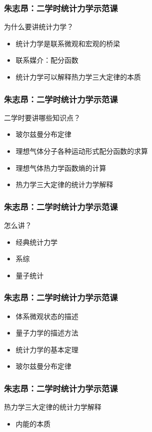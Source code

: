 \documentclass[dvipsnames, svgnames, x11names]{beamer}
\begin{document}
\begin{frame}
    \frametitle{朱志昂：二学时统计力学示范课}
    为什么要讲统计力学？
    \begin{itemize}
      \item 统计力学是联系微观和宏观的桥梁
      \item 联系媒介：配分函数
      \item 统计力学可以解释热力学三大定律的本质
    \end{itemize}
\end{frame}


\begin{frame}
    \frametitle{朱志昂：二学时统计力学示范课}
    二学时要讲哪些知识点？
    \begin{itemize}
      \item 玻尔兹曼分布定律
      \item 理想气体分子各种运动形式配分函数的求算
      \item 理想气体热力学函数熵的计算
      \item 热力学三大定律的统计力学解释
    \end{itemize}
\end{frame}


\begin{frame}
    \frametitle{朱志昂：二学时统计力学示范课}
    怎么讲？
    \begin{itemize}
      \item 经典统计力学
      \item 系综
      \item 量子统计
    \end{itemize}
\end{frame}


\begin{frame}
    \frametitle{朱志昂：二学时统计力学示范课}
    \begin{itemize}
      \item 体系微观状态的描述
      \item 量子力学的描述方法
      \item 统计力学的基本定理
      \item 玻尔兹曼分布定律 
    \end{itemize}
\end{frame}


\begin{frame}
    \frametitle{朱志昂：二学时统计力学示范课}
    热力学三大定律的统计力学解释
    \begin{itemize}
      \item 内能的本质
    \end{itemize}
\end{frame}
\end{document}
